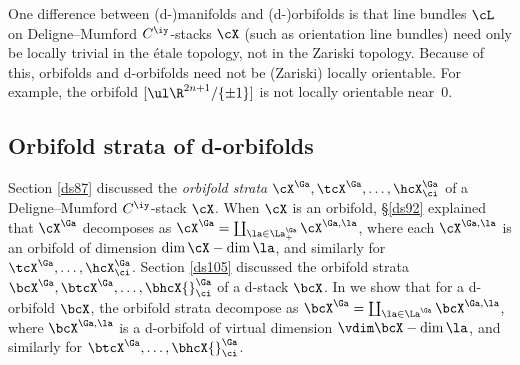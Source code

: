 \documentclass{article}
\begin{document}
One difference between (d-)manifolds and (d-)orbifolds is that line
bundles $\cL$ on Deligne--Mumford $C^\iy$-stacks $\cX$ (such as
orientation line bundles) need only be
locally trivial in the \'etale topology, not in the Zariski topology. Because
of this, orbifolds and d-orbifolds need not be (Zariski) locally
orientable. For example, the orbifold $[\ul\R^{2n+1}/\{\pm 1\}]$ is
not locally orientable near~0.

\subsection{Orbifold strata of d-orbifolds}
\label{ds118}

Section \ref{ds87} discussed the {\it orbifold strata\/}
$\cX^\Ga,\tcX^\Ga, \ldots,\hcX^\Ga_\ci$ of a Deligne--Mumford
$C^\iy$-stack $\cX$. When $\cX$ is an orbifold, \S\ref{ds92}
explained that $\cX^\Ga$ decomposes as
$\cX^\Ga=\coprod_{\smash{\la\in\La^\Ga_+}} \cX^{\Ga,\la}$, where
each $\cX^{\Ga,\la}$ is an orbifold of dimension $\dim\cX-\dim\la$,
and similarly for $\tcX^\Ga,\ldots,\hcX^\Ga_\ci$. Section
\ref{ds105} discussed the orbifold strata
$\bcX^\Ga,\btcX^\Ga,\ldots,\bhcX{}^\Ga_\ci$ of a d-stack $\bcX$. In
\cite[\S 10.7]{Joyc6} we show that for a d-orbifold $\bcX$, the
orbifold strata decompose as $\bcX^\Ga=\coprod_{
\smash{\la\in\La^\Ga}} \bcX^{\Ga,\la}$, where $\bcX^{\Ga,\la}$ is a
d-orbifold of virtual dimension $\vdim\bcX-\dim\la$, and similarly
for $\btcX^\Ga,\ldots,\bhcX{}^\Ga_\ci$.
\end{document}
